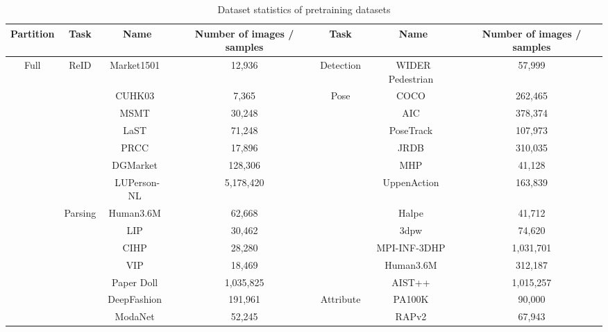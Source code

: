 \documentclass[10pt,twocolumn,letterpaper]{article}
\begin{document}
\begin{table*}[t]
  \centering
  \footnotesize
  \caption{Dataset statistics of pretraining datasets}
    \begin{tabular}{c|c|cc|c|cc}
    \toprule
    Partition & Task  & Name  & Number of images / samples & Task  & Name  & Number of images / samples \\
    \hline
    \multirow{19}[12]{*}{Full} & \multirow{7}[4]{*}{ReID} & Market1501~\cite{zheng2015scalable} & 12,936  & Detection & WIDER Pedestrian~\cite{loy2019wider} & 57,999  \\
\cline{5-7}          &       & CUHK03~\cite{li2014deepreid} & 7,365  & \multirow{11}[4]{*}{Pose} & COCO~\cite{lin2014microsoft}  & 262,465  \\
          &       & MSMT~\cite{wei2018person} & 30,248  &       & AIC~\cite{wu2019large}   & 378,374  \\
          &       & LaST~\cite{shu2021large}  & 71,248  &       & PoseTrack~\cite{andriluka2018posetrack} & 107,973  \\
          &       & PRCC~\cite{yang2019person}  & 17,896  &       & JRDB~\cite{vendrow2022jrdb}  & 310,035  \\
          &       & DGMarket~\cite{zheng2019joint} & 128,306  &       & MHP~\cite{li2017multiple}   & 41,128  \\
          &       & LUPerson-NL~\cite{fu2021unsupervised} & 5,178,420  &       & UppenAction~\cite{zhang2013actemes} & 163,839  \\
\cline{2-4}          & \multirow{7}[4]{*}{Parsing} & Human3.6M~\cite{h36m_pami} & 62,668  &       & Halpe~\cite{fang2022alphapose} & 41,712  \\
          &       & LIP~\cite{gong2017look}   & 30,462  &       & 3dpw~\cite{von2018recovering}  & 74,620  \\
          &       & CIHP~\cite{gong2018instance}  & 28,280  &       & MPI-INF-3DHP~\cite{mehta2017monocular} & 1,031,701  \\
          &       & VIP~\cite{zhou2018adaptive}   & 18,469  &       & Human3.6M~\cite{h36m_pami} & 312,187  \\
          &       & Paper Doll~\cite{yamaguchi2013paper} & 1,035,825  &       & AIST++~\cite{li2021ai} & 1,015,257  \\
\cline{5-7}          &       & DeepFashion~\cite{liu2016deepfashion} & 191,961  & \multirow{6}[4]{*}{Attribute} & PA100K~\cite{liu2017hydraplus} & 90,000  \\
          &       & ModaNet~\cite{zheng2018modanet} & 52,245  &       & RAPv2~\cite{li2018richly} & 67,943  \\

\end{tabular}
\end{table*}
\end{document}
